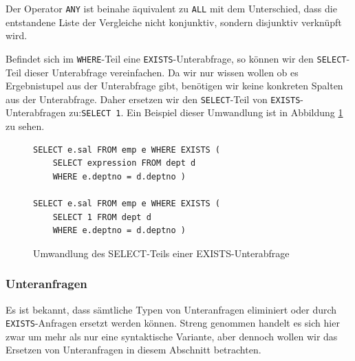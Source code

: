 Der Operator \verb|ANY| ist beinahe äquivalent zu \verb|ALL| mit dem Unterschied, dass die entstandene Liste der Vergleiche nicht konjunktiv, sondern disjunktiv verknüpft wird.

Befindet sich im \verb|WHERE|-Teil eine \verb|EXISTS|-Unterabfrage, so können wir den \verb|SELECT|-Teil dieser Unterabfrage vereinfachen. Da wir nur wissen wollen ob es Ergebnistupel aus der Unterabfrage gibt, benötigen wir keine konkreten Spalten aus der Unterabfrage. Daher ersetzen wir den \verb|SELECT|-Teil von \verb|EXISTS|-Unterabfragen zu:\verb|SELECT 1|. Ein Beispiel dieser Umwandlung ist in Abbildung \ref{fig:exists_ex1} zu sehen.

\begin{figure}[h]
\begin{verbatim}
SELECT e.sal FROM emp e WHERE EXISTS (
    SELECT expression FROM dept d 
    WHERE e.deptno = d.deptno )
    
SELECT e.sal FROM emp e WHERE EXISTS (
    SELECT 1 FROM dept d 
    WHERE e.deptno = d.deptno )
\end{verbatim}
\caption{Umwandlung des SELECT-Teils einer EXISTS-Unterabfrage}
\label{fig:exists_ex1}
\end{figure}



\subsubsection*{Unteranfragen}

Es ist bekannt, dass sämtliche Typen von Unteranfragen eliminiert oder durch \verb|EXISTS|-Anfragen ersetzt werden können. Streng genommen handelt es sich hier zwar um mehr als nur eine syntaktische Variante, aber dennoch wollen wir das Ersetzen von Unteranfragen in diesem Abschnitt betrachten.

